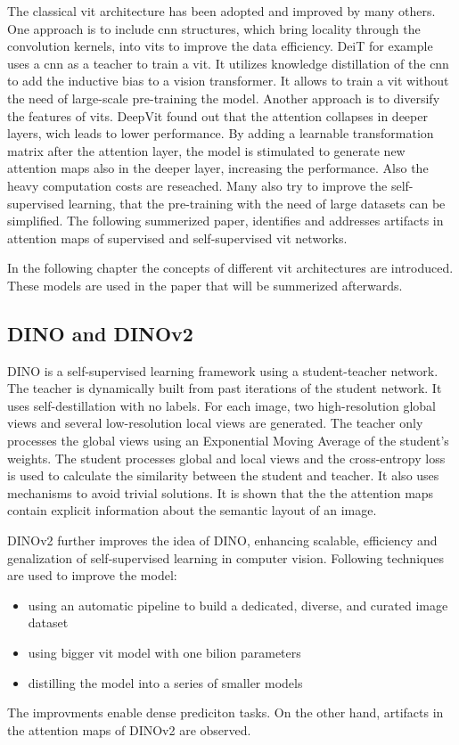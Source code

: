 \documentclass[conference]{IEEEtran}
\begin{document}
  The classical \ac{vit} architecture has been adopted and improved by many others. One approach is to include \ac{cnn} structures, which bring locality through the convolution kernels, into \acp{vit} to improve the data efficiency. DeiT \cite{deit} for example uses a \ac{cnn} as a teacher to train a \ac{vit}. It utilizes knowledge distillation of the \ac{cnn} to add the inductive bias to a vision transformer. It allows to train a \ac{vit} without the need of large-scale pre-training the model. \cite{vit-state-challenges} Another approach is to diversify the features of \acp{vit}. DeepVit \cite{deepvit} found out that the attention collapses in deeper layers, wich leads to lower performance. By adding a learnable transformation matrix after the attention layer, the model is stimulated to generate new attention maps also in the deeper layer, increasing the performance. \cite{vit-state-challenges} Also the heavy computation costs are reseached. Many also try to improve the self-supervised learning, that the pre-training with the need of large datasets can be simplified. \cite{vit-state-challenges} The following summerized paper, identifies and addresses artifacts in attention maps of supervised and self-supervised \ac{vit} networks.
  
  In the following chapter the concepts of different \ac{vit} architectures are introduced. These models are used in the paper \cite{registers} that will be summerized afterwards.

  \subsection{DINO and DINOv2}
  \cite{dino} \cite{dinov2}
  DINO is a self-supervised learning framework using a student-teacher network. The teacher is dynamically built from past iterations of the student network. It uses self-destillation with no labels. For each image, two high-resolution global views and several low-resolution local views are generated. The teacher only processes the global views using an Exponential Moving Average of the student's weights. The student processes global and local views and the cross-entropy loss is used to calculate the similarity between the student and teacher. It also uses mechanisms to avoid trivial solutions. \cite{dino} It is shown that the the attention maps contain explicit information about the semantic layout of an image. \cite{registers}

  DINOv2 further improves the idea of DINO, enhancing scalable, efficiency and genalization of self-supervised learning in computer vision. Following techniques are used to improve the model:
  \begin{itemize}
    \item  using an automatic pipeline to build a dedicated, diverse, and curated image dataset
    \item  using bigger \ac{vit} model with one bilion parameters
    \item distilling the model into a series of smaller models \cite{dinov2}
  \end{itemize}
  The improvments enable dense prediciton tasks. On the other hand, artifacts in the attention maps of DINOv2 are observed. \cite{registers}
\end{document}
